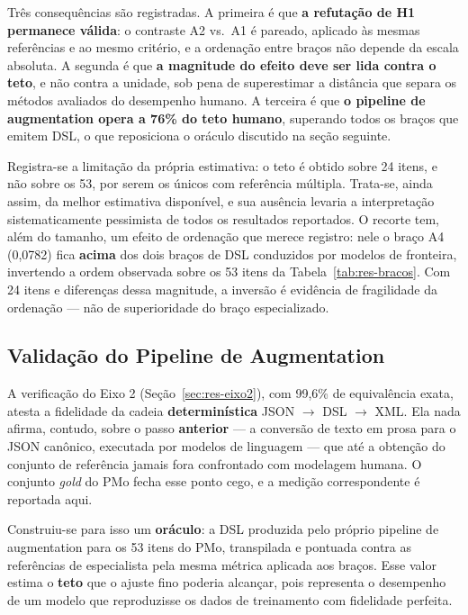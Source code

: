 Três consequências são registradas. A primeira é que \textbf{a refutação de H1 permanece válida}: o contraste A2 vs.\ A1 é pareado, aplicado às mesmas referências e ao mesmo critério, e a ordenação entre braços não depende da escala absoluta. A segunda é que \textbf{a magnitude do efeito deve ser lida contra o teto}, e não contra a unidade, sob pena de superestimar a distância que separa os métodos avaliados do desempenho humano. A terceira é que \textbf{o pipeline de augmentation opera a 76\% do teto humano}, superando todos os braços que emitem DSL, o que reposiciona o oráculo discutido na seção seguinte.

Registra-se a limitação da própria estimativa: o teto é obtido sobre 24 itens, e não sobre os 53, por serem os únicos com referência múltipla. Trata-se, ainda assim, da melhor estimativa disponível, e sua ausência levaria a interpretação sistematicamente pessimista de todos os resultados reportados. O recorte tem, além do tamanho, um efeito de ordenação que merece registro: nele o braço A4 (0,0782) fica \textbf{acima} dos dois braços de DSL conduzidos por modelos de fronteira, invertendo a ordem observada sobre os 53 itens da Tabela~\ref{tab:res-bracos}. Com 24 itens e diferenças dessa magnitude, a inversão é evidência de fragilidade da ordenação --- não de superioridade do braço especializado.

\subsection{Validação do Pipeline de Augmentation}
\label{subsec:res-oraculo}

A verificação do Eixo 2 (Seção~\ref{sec:res-eixo2}), com 99,6\% de equivalência exata, atesta a fidelidade da cadeia \textbf{determinística} JSON $\rightarrow$ DSL $\rightarrow$ XML. Ela nada afirma, contudo, sobre o passo \textbf{anterior} --- a conversão de texto em prosa para o JSON canônico, executada por modelos de linguagem --- que até a obtenção do conjunto de referência jamais fora confrontado com modelagem humana. O conjunto \textit{gold} do PMo fecha esse ponto cego, e a medição correspondente é reportada aqui.

Construiu-se para isso um \textbf{oráculo}: a DSL produzida pelo próprio pipeline de augmentation para os 53 itens do PMo, transpilada e pontuada contra as referências de especialista pela mesma métrica aplicada aos braços. Esse valor estima o \textbf{teto} que o ajuste fino poderia alcançar, pois representa o desempenho de um modelo que reproduzisse os dados de treinamento com fidelidade perfeita.

